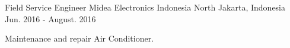 \begin{cventries}
  \cventry
    {Field Service Engineer} %
    {Midea Electronics Indonesia} %
    {North Jakarta, Indonesia} %
    {Jun. 2016 - August. 2016} %
    {
      \begin{cvitems} %
        \item {Maintenance and repair Air Conditioner.}
      \end{cvitems}
    }

\end{cventries}
